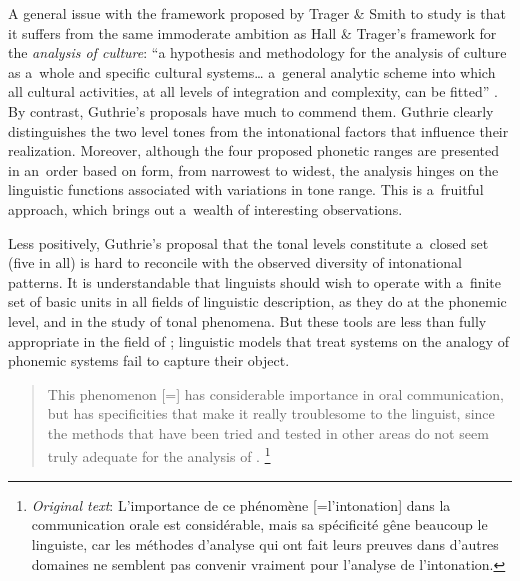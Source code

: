 A general issue with the framework proposed by Trager \& Smith to study  is that it suffers from the same immoderate ambition as Hall \& Trager's framework for the \textit{analysis of culture}: “a hypothesis and methodology for the analysis of culture as a~whole and specific cultural systems{\dots} a~general analytic scheme into which all cultural activities, at all levels of integration and complexity, can be fitted'' \citep[57]{halletal1953}. By contrast, Guthrie's proposals have much to commend them. Guthrie clearly distinguishes the two level tones from the intonational factors that influence their realization. Moreover, although the four proposed phonetic ranges are presented in an~order based on form, from narrowest to widest, the analysis hinges on the linguistic functions associated with variations in tone range. This is a~fruitful approach, which brings out a~wealth of interesting observations. 

Less positively, Guthrie's proposal that the tonal levels constitute a~closed set (five in all) is hard to reconcile with the observed diversity of intonational patterns. It is understandable that linguists should wish to operate with a~finite set of basic units in all fields of linguistic description, as they do at the phonemic level, and in the study of tonal phenomena. But these tools are less than fully appropriate in the field of ; linguistic models that treat  systems on the {analogy} of phonemic systems fail to capture their object.
\begin{quotation}
	This phenomenon [=] has considerable importance in oral communication, but has specificities that make it really troublesome to the linguist, since the methods that have been tried and tested in other areas do not seem truly adequate for the analysis of . \citep[173]{creissels1994}\footnote{\textit{Original text}: L'importance de ce phénomène [=l'{intonation}] dans la communication orale est considérable, mais sa spécificité gêne beaucoup le linguiste, car les méthodes d'analyse qui ont fait leurs preuves dans d'autres domaines ne semblent pas convenir vraiment pour l'analyse de l'{intonation}.}
\end{quotation}

